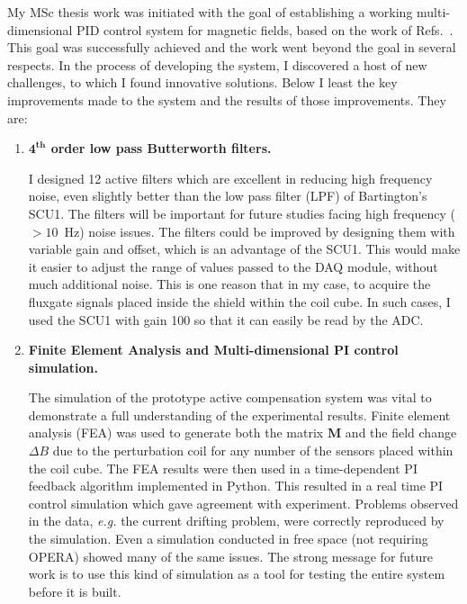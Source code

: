 My MSc thesis work was initiated with the goal of establishing a
working multi-dimensional PID control system for magnetic fields,
based on the work of Refs.~\cite{bea,lins}.  This goal was
successfully achieved and the work went beyond the goal in several
respects.  In the process of developing the system, I discovered a host
of new challenges, to which I found innovative solutions.  Below I
least the key improvements made to the system and the results of those
improvements.  They are:
\begin{enumerate}
\item {\bf $\mathbf{4^{th}}$ order low pass Butterworth filters.}  

I designed 12 active filters which are excellent in reducing high frequency noise, even slightly better than the low pass filter (LPF) of Bartington's SCU1. The filters will be important for future studies facing high frequency ($>10$~Hz) noise issues. The filters could be improved by designing them with variable gain and offset, which is an advantage of the SCU1. This would make it easier to adjust the range of values passed to the DAQ module, without much additional noise. This is one reason that in my case, to acquire the fluxgate signals placed inside the shield within the coil cube. In such cases, I used the SCU1 with gain 100 so that it can easily be read by the ADC.  

\item {\bf Finite Element Analysis and Multi-dimensional PI control simulation.}  

The simulation of the prototype active compensation system was vital to demonstrate a full understanding of the experimental results. Finite element analysis (FEA) was used to generate both the matrix $\bm{M}$ and the field change $\Delta B$ due to the perturbation coil for any number of the sensors placed within the coil cube. The FEA results were then used in a time-dependent PI feedback algorithm implemented in Python. This resulted in a real time PI control simulation which gave agreement with experiment. Problems observed in the data, {\it e.g.} the current drifting problem, were correctly reproduced by the simulation. Even a simulation conducted in free space (not requiring OPERA) showed many of the same issues. The strong message for future work is to use this kind of simulation as a tool for testing the entire system before it is built.



\end{enumerate}
